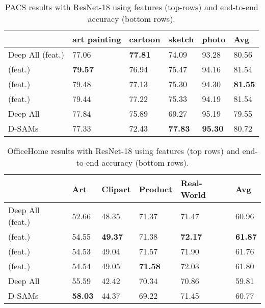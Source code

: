 \begin{table}
\centering
\caption{PACS results with ResNet-18 using features (top-rows) and end-to-end accuracy (bottom rows).}
\label{table:resnetpacs}
\begin{tabular}{p{2.5cm}p{1.9cm}p{1.9cm}p{1.9cm}p{1.9cm}|p{1.9cm}}
\hline
\textbf{}   & art painting & cartoon & sketch & photo & Avg   \\
\hline
Deep All (feat.) & 77.06        & \textbf{77.81}   & 74.09  & 93.28 & 80.56 \\
 (feat.)    & \textbf{79.57}        & 76.94   & 75.47  & 94.16 & 81.54 \\
 (feat.)    & 79.48        & 77.13   & 75.30  & 94.30 & \textbf{81.55} \\
 (feat.) & 79.44 & 77.22 & 75.33 & 94.19 & 81.54
\\
\hline
Deep All    & 77.84        & 75.89   & 69.27  & 95.19  & 79.55 \\
D-SAMs       & 77.33        & 72.43   & \textbf{77.83}  &  \textbf{95.30} & 80.72
\end{tabular}
\end{table}

\begin{table}
\caption{OfficeHome results with ResNet-18 using features (top rows) and end-to-end accuracy (bottom rows).}
\label{table:resnetoh}
\begin{tabular}
{p{2.5cm}p{1.9cm}p{1.9cm}p{1.9cm}p{1.9cm}|p{1.9cm}}
\hline
\textbf{}      & Art   & Clipart & Product & Real-World & Avg   \\
\hline
Deep All (feat.) & 52.66 & 48.35   & 71.37   & 71.47      & 60.96 \\
 (feat.) & 54.55 & \textbf{49.37}   & 71.38   & \textbf{72.17}      & \textbf{61.87} \\
 (feat.)     & 54.53    & 49.04      & 71.57      & 71.90         & 61.76    \\
 (feat.) & 54.54 & 49.05 & \textbf{71.58} & 72.03 & 61.80 \\
\hline
Deep All       & 55.59 & 42.42   & 70.34   & 70.86      & 59.81 \\
D-SAMs          & \textbf{58.03} & 44.37   & 69.22   & 71.45      & 60.77
\end{tabular}
\end{table}
